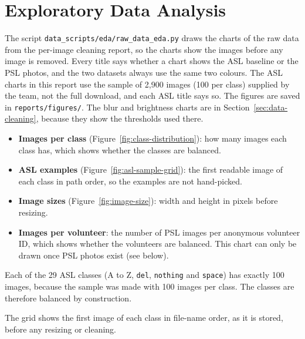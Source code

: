 \section{Exploratory Data Analysis}
\label{sec:eda}

The script \texttt{data\_scripts/eda/raw\_data\_eda.py} draws the charts of the raw data from the per-image cleaning report, so the charts show the images before any image is removed. Every title says whether a chart shows the ASL baseline or the PSL photos, and the two datasets always use the same two colours. The ASL charts in this report use the sample of 2{,}900 images (100 per class) supplied by the team, not the full download, and each ASL title says so. The figures are saved in \texttt{reports/figures/}. The blur and brightness charts are in Section~\ref{sec:data-cleaning}, because they show the thresholds used there.

\begin{itemize}
  \item \textbf{Images per class} (Figure~\ref{fig:class-distribution}): how many images each class has, which shows whether the classes are balanced.
  \item \textbf{ASL examples} (Figure~\ref{fig:asl-sample-grid}): the first readable image of each class in path order, so the examples are not hand-picked.
  \item \textbf{Image sizes} (Figure~\ref{fig:image-size}): width and height in pixels before resizing.
  \item \textbf{Images per volunteer}: the number of PSL images per anonymous volunteer ID, which shows whether the volunteers are balanced. This chart can only be drawn once PSL photos exist (see below).
\end{itemize}


Each of the 29 ASL classes (A to Z, \texttt{del}, \texttt{nothing} and \texttt{space}) has exactly 100 images, because the sample was made with 100 images per class. The classes are therefore balanced by construction.


The grid shows the first image of each class in file-name order, as it is stored, before any resizing or cleaning.

